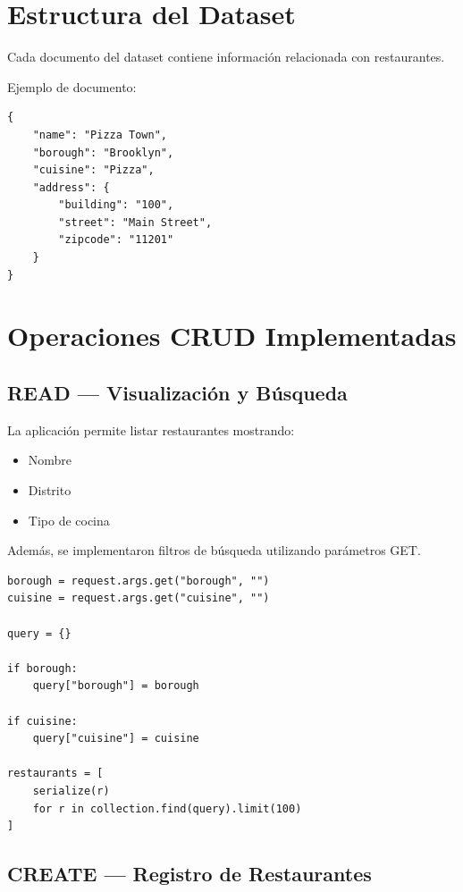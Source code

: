 \documentclass[12pt]{article}
\begin{document}
\section{Estructura del Dataset}

Cada documento del dataset contiene información relacionada con restaurantes.

Ejemplo de documento:

\begin{lstlisting}
{
    "name": "Pizza Town",
    "borough": "Brooklyn",
    "cuisine": "Pizza",
    "address": {
        "building": "100",
        "street": "Main Street",
        "zipcode": "11201"
    }
}
\end{lstlisting}


\section{Operaciones CRUD Implementadas}

\subsection{READ — Visualización y Búsqueda}

La aplicación permite listar restaurantes mostrando:

\begin{itemize}
    \item Nombre
    \item Distrito
    \item Tipo de cocina
\end{itemize}

Además, se implementaron filtros de búsqueda utilizando parámetros GET.

\begin{lstlisting}
borough = request.args.get("borough", "")
cuisine = request.args.get("cuisine", "")

query = {}

if borough:
    query["borough"] = borough

if cuisine:
    query["cuisine"] = cuisine

restaurants = [
    serialize(r)
    for r in collection.find(query).limit(100)
]
\end{lstlisting}


\subsection{CREATE — Registro de Restaurantes}
\end{document}
